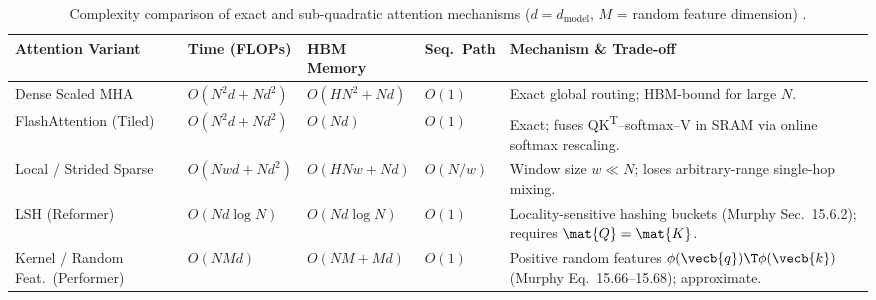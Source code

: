 \documentclass[../../../../master.tex]{subfiles}
\begin{document}
\begin{table}[htbp]
\centering
\footnotesize
\setlength{\tabcolsep}{4pt}
\begin{tabularx}{\textwidth}{@{}p{2.7cm} p{2.1cm} p{2.0cm} p{1.2cm} >{\raggedright\arraybackslash}X@{}}
\toprule
\textbf{Attention Variant} & \textbf{Time (FLOPs)} & \textbf{HBM Memory} & \textbf{Seq.\ Path} & \textbf{Mechanism \& Trade-off} \\
\midrule
Dense Scaled MHA & $O(N^2 d + N d^2)$ & $O(H N^2 + N d)$ & $O(1)$ & Exact global routing; HBM-bound for large $N$. \\
FlashAttention (Tiled) & $O(N^2 d + N d^2)$ & $O(N d)$ & $O(1)$ & Exact; fuses QK\textsuperscript{T}--softmax--V in SRAM via online softmax rescaling. \\
Local / Strided Sparse & $O(N w d + N d^2)$ & $O(H N w + N d)$ & $O(N/w)$ & Window size $w \ll N$; loses arbitrary-range single-hop mixing. \\
LSH (Reformer) & $O(N d \log N)$ & $O(N d \log N)$ & $O(1)$ & Locality-sensitive hashing buckets (Murphy Sec.~15.6.2); requires $\mat{Q}=\mat{K}$. \\
Kernel / Random Feat.\ (Performer) & $O(N M d)$ & $O(N M + M d)$ & $O(1)$ & Positive random features $\phi(\vecb{q})\T\phi(\vecb{k})$ (Murphy Eq.~15.66--15.68); approximate. \\
\bottomrule
\end{tabularx}
\caption{Complexity comparison of exact and sub-quadratic attention mechanisms ($d = d_{\mathrm{model}}$, $M$ = random feature dimension) .}
\label{tab:attn:complexity}
\end{table}
\end{document}
